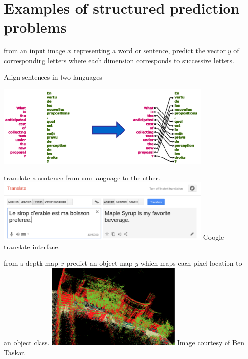 \newpage
\section{Examples of structured prediction problems}

\begin{example}
from an input image $x$ representing a word or sentence, predict the vector $y$
of corresponding letters where each dimension corresponds to successive
letters.  \end{example}

\begin{example}
Align sentences in two languages.
\par
  \centering
    \includegraphics[width=0.8\textwidth]{img/wordalign}
\end{example}

\begin{example}
translate a sentence from one language to the other.
  \centering
    \includegraphics[width=0.8\textwidth]{img/googletranslate}
Google translate interface.

\end{example}

\begin{example}
from a depth map $x$ predict an object map $y$ which maps each pixel location
to an object class.
  \centering
    \includegraphics[width=0.5\textwidth]{img/3d}
Image courtesy of Ben Taskar.
\end{example}

